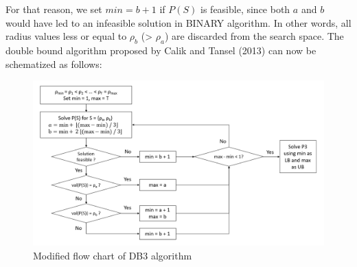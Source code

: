 For that reason, we set $min = b + 1$ if $P(S)$ is feasible, since both $a$ and $b$ would have led to an infeasible solution in BINARY algorithm.
In other words, all radius values less or equal to $\rho_b$ (> $\rho_a$) are discarded from the search space.
The double bound algorithm proposed by Calik and Tansel (2013) can now be schematized as follows:
\begin{figure}[h!]
	\begin{center}
		\includegraphics[width=\textwidth]{../imgs/DB3.png}\\
		Modified flow chart of DB3 algorithm
	\end{center}
\end{figure}